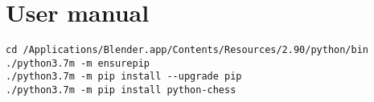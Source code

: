 \documentclass[../../main.tex]{subfiles}
\begin{document}
\chapter{User manual}

\begin{verbatim}
cd /Applications/Blender.app/Contents/Resources/2.90/python/bin
./python3.7m -m ensurepip
./python3.7m -m pip install --upgrade pip
./python3.7m -m pip install python-chess
\end{verbatim}
\end{document}
